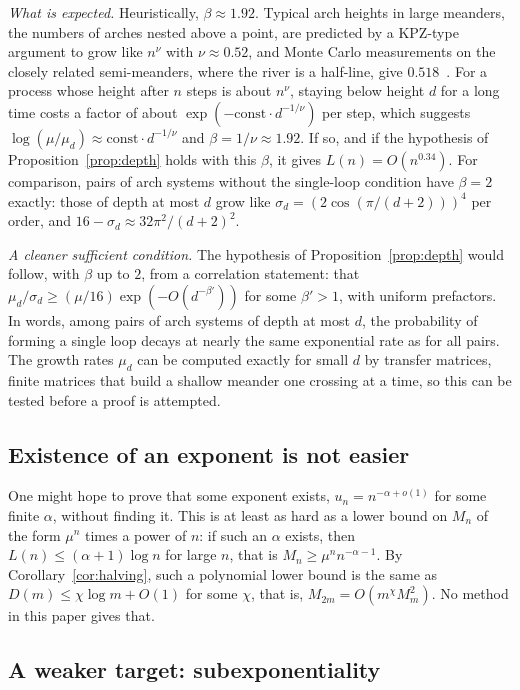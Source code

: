 \emph{What is expected.} Heuristically, $\beta\approx1.92$. Typical arch heights in large meanders, the
numbers of arches nested above a point, are predicted by a KPZ-type argument to grow like $n^\nu$ with $\nu\approx0.52$, and Monte Carlo measurements on the
closely related semi-meanders, where the river is a half-line, give $0.518$~\cite{Golinelli}. For a process whose height after $n$ steps is about
$n^\nu$, staying below height $d$ for a long time costs a factor of about
$\exp(-\mathrm{const}\cdot d^{-1/\nu})$ per step, which suggests
$\log(\mu/\mu_d)\approx\mathrm{const}\cdot d^{-1/\nu}$ and $\beta=1/\nu\approx1.92$. If so, and if the
hypothesis of Proposition~\ref{prop:depth} holds with this $\beta$, it gives $L(n)=O(n^{0.34})$. For comparison, pairs of arch systems without the
single-loop condition have $\beta=2$ exactly: those of depth at most $d$ grow like
$\sigma_d=(2\cos(\pi/(d+2)))^4$ per order, and $16-\sigma_d\approx32\pi^2/(d+2)^2$.

\emph{A cleaner sufficient condition.} The hypothesis of Proposition~\ref{prop:depth} would follow, with
$\beta$ up to $2$, from a correlation statement: that
$\mu_d/\sigma_d\ge(\mu/16)\exp(-O(d^{-\beta'}))$ for some $\beta'>1$, with uniform prefactors. In words, among pairs of arch systems of depth at most
$d$, the probability of forming a single loop decays at nearly the same exponential rate as for all
pairs. The growth rates $\mu_d$ can be computed exactly for small $d$ by transfer matrices, finite
matrices that build a shallow meander one crossing at a time, so this can be tested before a proof is attempted.

\subsection{Existence of an exponent is not easier}

One might hope to prove that some exponent exists, $u_n=n^{-\alpha+o(1)}$ for some finite $\alpha$,
without finding it. This is at least as hard as a lower bound on $M_n$ of the form $\mu^n$ times a
power of $n$: if such an $\alpha$ exists,
then $L(n)\le(\alpha+1)\log n$ for large $n$, that is $M_n\ge\mu^nn^{-\alpha-1}$. By
Corollary~\ref{cor:halving}, such a polynomial lower bound is the same as $D(m)\le\chi\log m+O(1)$ for
some $\chi$, that is, $M_{2m}=O(m^{\chi}M_m^2)$. No method in this paper gives that.

\subsection{A weaker target: subexponentiality}\label{sec:subexp}

